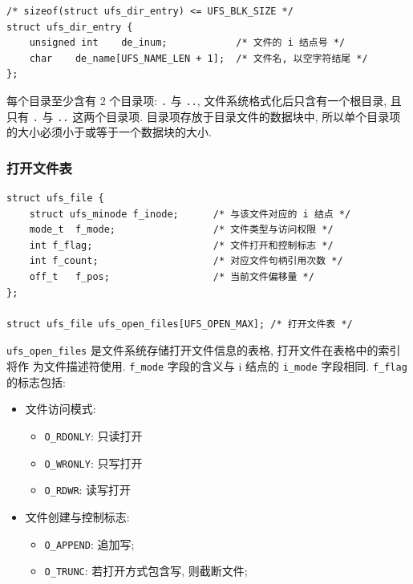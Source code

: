\documentclass[nofonts, titlepage]{ctexart}
\begin{document}
\begin{verbatim}
/* sizeof(struct ufs_dir_entry) <= UFS_BLK_SIZE */
struct ufs_dir_entry {
    unsigned int    de_inum;            /* 文件的 i 结点号 */
    char    de_name[UFS_NAME_LEN + 1];  /* 文件名, 以空字符结尾 */
};
\end{verbatim}

每个目录至少含有 2 个目录项: \texttt{.} 与 \texttt{..},
文件系统格式化后只含有一个根目录, 且只有 \texttt{.} 与 \texttt{..}
这两个目录项. 目录项存放于目录文件的数据块中,
所以单个目录项的大小必须小于或等于一个数据块的大小.

\subsubsection{打开文件表}\label{ux6253ux5f00ux6587ux4ef6ux8868}

\begin{verbatim}
struct ufs_file {
    struct ufs_minode f_inode;      /* 与该文件对应的 i 结点 */
    mode_t  f_mode;                 /* 文件类型与访问权限 */
    int f_flag;                     /* 文件打开和控制标志 */
    int f_count;                    /* 对应文件句柄引用次数 */
    off_t   f_pos;                  /* 当前文件偏移量 */
};

struct ufs_file ufs_open_files[UFS_OPEN_MAX]; /* 打开文件表 */
\end{verbatim}

\texttt{ufs\_open\_files} 是文件系统存储打开文件信息的表格,
打开文件在表格中的索引将作 为文件描述符使用. \texttt{f\_mode}
字段的含义与 i 结点的 \texttt{i\_mode} 字段相同. \texttt{f\_flag}
的标志包括:
\begin{itemize}
    \item
        文件访问模式: 
        \begin{itemize}
            \item
                \texttt{O\_RDONLY}: 只读打开
            \item
                \texttt{O\_WRONLY}: 只写打开
            \item
                \texttt{O\_RDWR}: 读写打开
        \end{itemize}
    \item
        文件创建与控制标志: 
        \begin{itemize}
            \item
                \texttt{O\_APPEND}: 追加写; 
            \item
                \texttt{O\_TRUNC}:
                若打开方式包含写, 则截断文件;
        \end{itemize}
\end{itemize}
\end{document}
